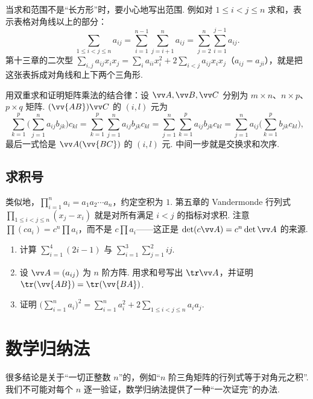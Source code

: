 当求和范围不是“长方形”时，要小心地写出范围. 例如对 $1\le i<j\le n$ 求和，表示表格对角线以上的部分：
\[\sum_{1\le i<j\le n}a_{ij}=\sum_{i=1}^{n-1}\sum_{j=i+1}^na_{ij}=\sum_{j=2}^n\sum_{i=1}^{j-1}a_{ij}.\]
第十三章的二次型 $\sum_{i,j}a_{ij}x_ix_j=\sum_ia_{ii}x_i^2+2\sum_{i<j}a_{ij}x_ix_j$（$a_{ij}=a_{ji}$），就是把这张表拆成对角线和上下两个三角形.

\begin{example}
	用双重求和证明矩阵乘法的结合律：设 $\vv A,\vv B,\vv C$ 分别为 $m\times n$、$n\times p$、$p\times q$ 矩阵. $(\vv{AB})\vv C$ 的 $(i,l)$ 元为
	\[\sum_{k=1}^p\Big(\sum_{j=1}^na_{ij}b_{jk}\Big)c_{kl}=\sum_{k=1}^p\sum_{j=1}^na_{ij}b_{jk}c_{kl}=\sum_{j=1}^n\sum_{k=1}^pa_{ij}b_{jk}c_{kl}=\sum_{j=1}^na_{ij}\Big(\sum_{k=1}^pb_{jk}c_{kl}\Big),\]
	最后一式恰是 $\vv A(\vv{BC})$ 的 $(i,l)$ 元. 中间一步就是交换求和次序.
\end{example}

\subsection{求积号}

类似地，$\displaystyle\prod_{i=1}^na_i=a_1a_2\cdots a_n$，约定空积为 $1$. 第五章的 Vandermonde 行列式 $\prod_{1\le i<j\le n}(x_j-x_i)$ 就是对所有满足 $i<j$ 的指标对求积. 注意 $\prod(ca_i)=c^n\prod a_i$，而不是 $c\prod a_i$——这正是 $\det(c\vv A)=c^n\det\vv A$ 的来源.

\begin{exercise}\label{exo:prelim-sum}
	\begin{enumerate}
		\item 计算 $\displaystyle\sum_{i=1}^{4}(2i-1)$ 与 $\displaystyle\sum_{i=1}^{3}\sum_{j=1}^{2}ij$.
		\item 设 $\vv A=(a_{ij})$ 为 $n$ 阶方阵. 用求和号写出 $\tr\vv A$，并证明 $\tr(\vv{AB})=\tr(\vv{BA})$.
		\item 证明 $\displaystyle\Big(\sum_{i=1}^na_i\Big)^2=\sum_{i=1}^na_i^2+2\sum_{1\le i<j\le n}a_ia_j$.
	\end{enumerate}
\end{exercise}

\section{数学归纳法}\label{app:induction}

很多结论是关于“一切正整数 $n$”的，例如“$n$ 阶三角矩阵的行列式等于对角元之积”. 我们不可能对每个 $n$ 逐一验证，数学归纳法提供了一种“一次证完”的办法.

